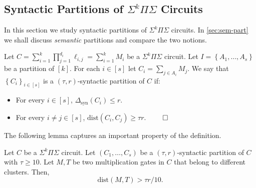 \documentclass[12pt]{article}
\renewcommand{\set}[1]{\left\{ #1 \right\}}
\newcommand{\SumProdSumk}{\Sigma^k \Pi \Sigma}
\newcommand{\Sps}[1]{\Sigma^{#1} \Pi\Sigma}
\newcommand{\ranksyn}{\Delta_{\text{syn}}}
\newcommand{\dist}{\text{dist}}
\begin{document}
	
	
	
	\subsection{Syntactic Partitions of $\Sps{k}$ Circuits}\label{sec:syn-part}
	
	
	In this section we study syntactic partitions of $\Sps{k}$ circuits. In \autoref{sec:sem-part} we shall discuss \emph{semantic} partitions and compare the two notions.
	
	\begin{definition}
		\label{def:tau-r-syntactic}
		Let $C = \sum_{i=1}^k \prod_{j=1}^{d_i} \ell_{i,j} = \sum_{i=1}^k M_i$ be a $\SumProdSumk$ circuit.
		Let $I = \set{A_1, \ldots, A_s}$ be a partition of $[k]$. For each $i \in [s]$ let $C_i = \sum_{j \in A_i} M_j$. We say that $\set{C_i}_{i \in [s]}$ is a $(\tau, r)$-syntactic partition of $C$ if:
		\begin{itemize}
			\item For every $i \in [s]$, $\ranksyn(C_i) \le r$.
			\item For every $i \neq j \in [s]$, $\dist(C_i, C_j) \ge \tau r$. $\hfill \qedhere$
		\end{itemize}
	\end{definition}
	
	
	The following lemma captures an important property of the definition.
	
	
	
	
	\begin{lemma}
		\label{lem:large-rank-syn}
		Let $C$ be a $\SumProdSumk$ circuit. Let $(C_1, \ldots, C_s)$ be a $(\tau,r)$-syntactic partition of $C$ with $\tau \ge 10$.
		Let $M, T$ be two multiplication gates in $C$ that belong to different clusters.
		Then,
		\[
		\dist(M,T) > \tau r / 10.
		\]
	\end{lemma}
	
\end{document}
